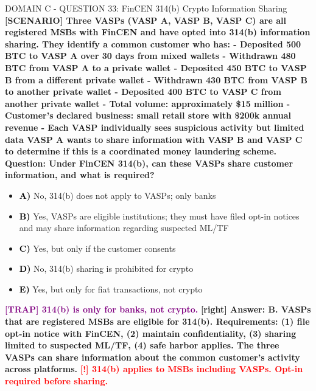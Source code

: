 \documentclass[11pt,a4paper]{beamer}
\newcommand{\redflag}[1]{\textcolor{red}{\textbf{[!] #1}}}
\newcommand{\trap}[1]{\textcolor{purple}{\textbf{[TRAP] #1}}}
\newcommand{\correct}[1]{\textcolor{green!50!black}{\textbf{[right] #1}}}
\newcommand{\scenario}[1]{\textcolor{blue!70!black}{\textbf{[SCENARIO] #1}}}
\newcommand{\option}[1]{\textcolor{black}{\textbf{#1}}}
\begin{document}
\begin{frame}{DOMAIN C - QUESTION 33: FinCEN 314(b) Crypto Information Sharing}
\scenario{Three VASPs (VASP A, VASP B, VASP C) are all registered MSBs with FinCEN and have opted into 314(b) information sharing. They identify a common customer who has:
- Deposited 500 BTC to VASP A over 30 days from mixed wallets
- Withdrawn 480 BTC from VASP A to a private wallet
- Deposited 450 BTC to VASP B from a different private wallet
- Withdrawn 430 BTC from VASP B to another private wallet
- Deposited 400 BTC to VASP C from another private wallet
- Total volume: approximately \$15 million
- Customer's declared business: small retail store with \$200k annual revenue
- Each VASP individually sees suspicious activity but limited data
VASP A wants to share information with VASP B and VASP C to determine if this is a coordinated money laundering scheme.}
\vspace{0.2cm}
\textbf{Question: Under FinCEN 314(b), can these VASPs share customer information, and what is required?}
\vspace{0.1cm}
\begin{itemize}
    \item \option{A)} No, 314(b) does not apply to VASPs; only banks
    \item \option{B)} Yes, VASPs are eligible institutions; they must have filed opt-in notices and may share information regarding suspected ML/TF
    \item \option{C)} Yes, but only if the customer consents
    \item \option{D)} No, 314(b) sharing is prohibited for crypto
    \item \option{E)} Yes, but only for fiat transactions, not crypto
\end{itemize}
\vspace{0.2cm}
\trap{314(b) is only for banks, not crypto.}
\correct{Answer: B. VASPs that are registered MSBs are eligible for 314(b). Requirements: (1) file opt-in notice with FinCEN, (2) maintain confidentiality, (3) sharing limited to suspected ML/TF, (4) safe harbor applies. The three VASPs can share information about the common customer's activity across platforms.}
\redflag{314(b) applies to MSBs including VASPs. Opt-in required before sharing.}
\end{frame}
\end{document}
